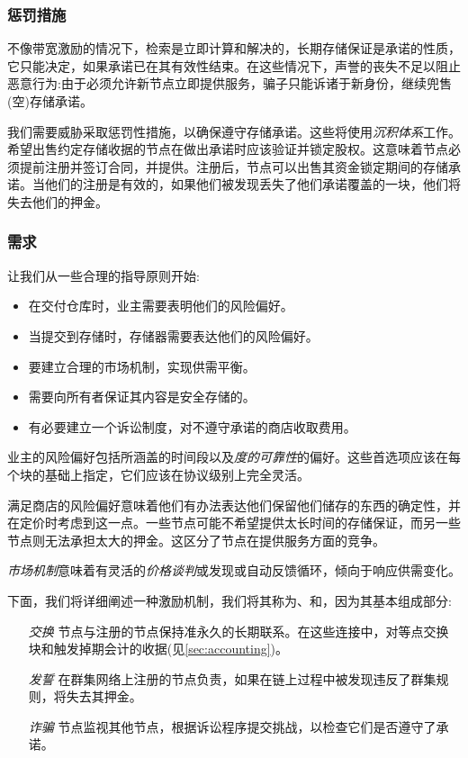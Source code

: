 \subsubsection{惩罚措施}

不像带宽激励的情况下，检索是立即计算和解决的，长期存储保证是承诺的性质，它只能决定，如果承诺已在其有效性结束。在这些情况下，声誉的丧失不足以阻止恶意行为:由于必须允许新节点立即提供服务，骗子只能诉诸于新身份，继续兜售(空)存储承诺。

我们需要威胁采取惩罚性措施，以确保遵守存储承诺。这些将使用\emph{沉积体系}工作。希望出售约定存储收据的节点在做出承诺时应该验证并锁定股权。这意味着节点必须提前注册并签订合同，并提供。注册后，节点可以出售其资金锁定期间的存储承诺。当他们的注册是有效的，如果他们被发现丢失了他们承诺覆盖的一块，他们将失去他们的押金。

\subsubsection{需求}

让我们从一些合理的指导原则开始:

\begin{itemize}
\item 在交付仓库时，业主需要表明他们的风险偏好。
\item 当提交到存储时，存储器需要表达他们的风险偏好。
\item 要建立合理的市场机制，实现供需平衡。
\item 需要向所有者保证其内容是安全存储的。
\item 有必要建立一个诉讼制度，对不遵守承诺的商店收取费用。
\end{itemize}

业主的风险偏好包括所涵盖的时间段以及\emph{度的可靠性}的偏好。这些首选项应该在每个块的基础上指定，它们应该在协议级别上完全灵活。

满足商店的风险偏好意味着他们有办法表达他们保留他们储存的东西的确定性，并在定价时考虑到这一点。一些节点可能不希望提供太长时间的存储保证，而另一些节点则无法承担太大的押金。这区分了节点在提供服务方面的竞争。

\emph{市场机制}意味着有灵活的\emph{价格谈判}或发现或自动反馈循环，倾向于响应供需变化。

下面，我们将详细阐述一种激励机制，我们将其称为、和，因为其基本组成部分:

\begin{itemize}
\item[\emph{交换}]
  节点与注册的节点保持准永久的长期联系。在这些连接中，对等点交换块和触发掉期会计的收据(见\ref{sec:accounting})。
  
\item[\emph{发誓}]
  在群集网络上注册的节点负责，如果在链上过程中被发现违反了群集规则，将失去其押金。

\item[\emph{诈骗}]
  节点监视其他节点，根据诉讼程序提交挑战，以检查它们是否遵守了承诺。

\end{itemize}

